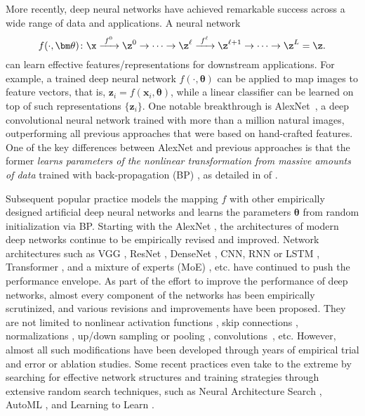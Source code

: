 \documentclass[../../book-main.tex]{subfiles}
\begin{document}
More recently, deep neural networks have achieved remarkable success across a wide range of data and applications. A neural network
\begin{equation}
  f(\cdot, \bm \theta) \colon \x
  \xrightarrow{\hspace{1mm} f^0 \hspace{1mm}} \z^0 \rightarrow \cdots
  \rightarrow \z^\ell \xrightarrow{\hspace{1mm} f^\ell \hspace{1mm}}
  \z^{\ell+1} \rightarrow  \cdots \to \z^L = \z.
\end{equation}
can learn effective features/representations for downstream applications. For example, a trained deep neural network $f(\cdot, \bm \theta)$ can be applied to map images to feature vectors, that is, $\bm{z}_i = f(\bm{x}_i,\bm \theta)$, while a linear classifier can be learned on top of such representations $\{\bm{z}_i\}$. One notable breakthrough is AlexNet~\cite{krizhevsky2012imagenet}, a deep convolutional neural network trained with more than a million natural images, outperforming all previous approaches that were based on hand-crafted features. One of the key differences between AlexNet and previous approaches is that the former \textit{learns parameters of the nonlinear transformation from massive amounts of data} trained with back-propagation (BP) \cite{Back-Prop}, as detailed in  of . 



Subsequent popular practice models the mapping $f$ with other empirically designed artificial deep neural networks and learns the parameters $\bm \theta$ from random initialization via BP. Starting with the AlexNet \cite{krizhevsky2012imagenet}, the architectures of modern deep networks continue to be empirically revised and improved. Network architectures such as VGG \cite{simonyan2014very}, ResNet \cite{he2016deep}, DenseNet \cite{dense-net}, CNN, RNN or LSTM \cite{LSTM}, Transformer \cite{vaswani2017attention}, and a mixture of experts (MoE) \cite{MoE,Fedus-2022}, etc. have continued to push the performance envelope. As part of the effort to improve the performance of deep networks, almost every component of the networks has been empirically scrutinized, and various revisions and improvements have been proposed. They are not limited to nonlinear activation functions \cite{maas2013rectifier,klambauer2017self,xu2015empirical,nwankpa2018activation}, skip connections \cite{ronneberger2015u,he2016deep}, normalizations \cite{ioffe2015batch,ba2016layer,ulyanov2016instance,wu2018group,miyato2018spectral}, up/down sampling or pooling \cite{scherer2010evaluation}, convolutions~\cite{lecun1998gradient,krizhevsky2012imagenet}, etc.
However, almost all such modifications have been developed through years of empirical {trial and error} or ablation studies. Some recent practices even take to the extreme by searching for effective network structures and training strategies through extensive random search techniques, such as Neural Architecture Search \cite{NAS-1,Baker2017DesigningNN}, AutoML \cite{automl}, and Learning to Learn \cite{andrychowicz2016learning}. 
\end{document}
